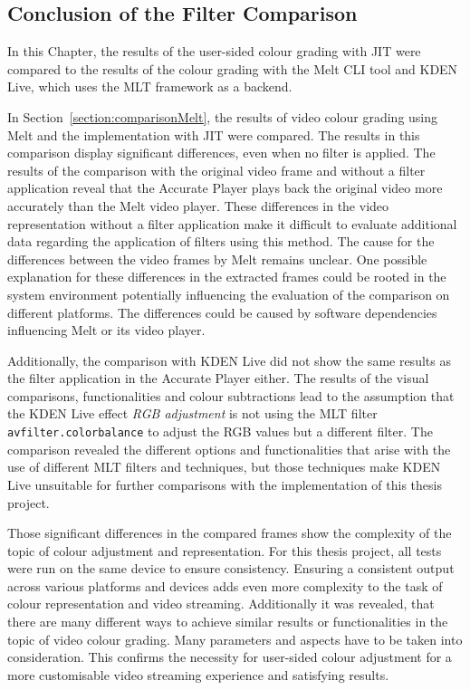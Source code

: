 \documentclass[../MasterThesis.tex]{subfiles}
\begin{document}

\newpage

\subsection{Conclusion of the Filter Comparison} \label{section:resultscomparisons}


In this Chapter, the results of the user-sided colour grading with JIT were compared to the results of the colour grading with the Melt CLI tool and KDEN Live, which uses the MLT framework as a backend.

In Section~\ref{section:comparisonMelt}, the results of video colour grading using Melt and the implementation with JIT were compared. 
The results in this comparison display significant differences, even when no filter is applied. 
The results of the comparison with the original video frame and without a filter application reveal that the Accurate Player plays back the original video more accurately than the Melt video player.
These differences in the video representation without a filter application make it difficult to evaluate additional data regarding the application of filters using this method. The cause for the differences between the video frames by Melt remains unclear.
One possible explanation for these differences in the extracted frames could be rooted in the system environment potentially influencing the evaluation of the comparison on different platforms. The differences could be caused by software dependencies influencing Melt or its video player.



Additionally, the comparison with KDEN Live did not show the same results as the filter application in the Accurate Player either. The results of the visual comparisons, functionalities and colour subtractions lead to the assumption that the KDEN Live effect \textit{RGB adjustment} is not using the MLT filter \texttt{avfilter.colorbalance} to adjust the RGB values but a different filter.
The comparison revealed the different options and functionalities that arise with the use of different MLT filters and techniques, but those techniques make KDEN Live unsuitable for further comparisons with the implementation of this thesis project.


Those significant differences in the compared frames show the complexity of the topic of colour adjustment and representation. 
For this thesis project, all tests were run on the same device to ensure consistency. 
Ensuring a consistent output across various platforms and devices adds even more complexity to the task of colour representation and video streaming.
%
Additionally it was revealed, that there are many different ways to achieve similar results or functionalities in the topic of video colour grading. Many parameters and aspects have to be taken into consideration. This confirms the necessity for user-sided colour adjustment for a more customisable video streaming experience and satisfying results. 
	
	
	
\end{document}
